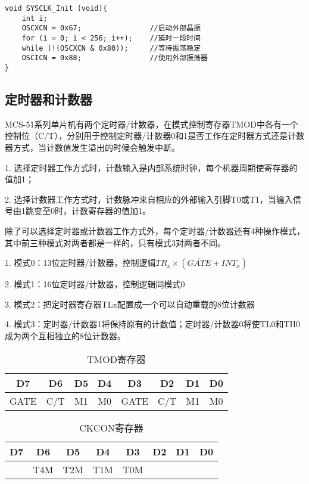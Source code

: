 \begin{spacing}{1.3}
\begin{lstlisting}
void SYSCLK_Init (void){
	int i;
	OSCXCN = 0x67;                //启动外部晶振
	for (i = 0; i < 256; i++);    //延时一段时间
	while (!(OSCXCN & 0x80));     //等待振荡稳定
	OSCICN = 0x88;                //使用外部振荡器
}
\end{lstlisting}

\subsection{定时器和计数器}
MCS-51系列单片机有两个定时器/计数器，在模式控制寄存器TMOD中各有一个控制位（C/T），分别用于控制定时器/计数器0和1是否工作在定时器方式还是计数器方式，当计数值发生溢出的时候会触发中断。

1. 选择定时器工作方式时，计数输入是内部系统时钟，每个机器周期使寄存器的值加1；

2. 选择计数器工作方式时，计数脉冲来自相应的外部输入引脚T0或T1，当输入信号由1跳变至0时，计数寄存器的值加1。

除了可以选择定时器或计数器工作方式外，每个定时器/计数器还有4种操作模式，其中前三种模式对两者都是一样的，只有模式3对两者不同。

1. 模式0：13位定时器/计数器，控制逻辑$TR_x \times (\overline{GATE}+INT_x)$

2. 模式1：16位定时器/计数器，控制逻辑同模式0

3. 模式2：把定时器寄存器TLx配置成一个可以自动重载的8位计数器

4. 模式3：定时器/计数器1将保持原有的计数值；定时器/计数器0将使TL0和TH0成为两个互相独立的8位计数器。

\begin{table}[H]
\centering
\begin{tabular}{|c|c|c|c|c|c|c|c|}
\toprule
D7 & D6 & D5 & D4 & D3 & D2 & D1 & D0 \\
\midrule
GATE & C/T & M1 & M0 & GATE & C/T & M1 & M0 \\
\bottomrule
\end{tabular}
\caption{TMOD寄存器}
\end{table}

\begin{table}[H]
\centering
\begin{tabular}{|c|c|c|c|c|c|c|c|}
\toprule
D7 & D6 & D5 & D4 & D3 & D2 & D1 & D0 \\
\midrule
 & T4M & T2M & T1M & T0M & & & \\ 
\bottomrule
\end{tabular}
\caption{CKCON寄存器}
\end{table}



\end{spacing}
